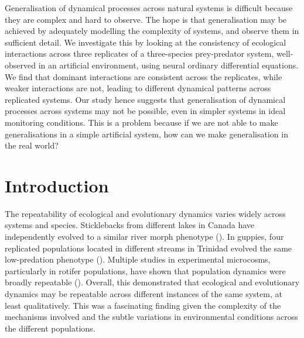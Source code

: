 \documentclass[11pt, oneside]{article}
\begin{document}
Generalisation of dynamical processes across natural systems is difficult because they are complex and hard to observe.
The hope is that generalisation may be achieved by adequately modelling the complexity of systems, and observe them in sufficient detail.
We investigate this by looking at the consistency of ecological interactions across three replicates of a three-species prey-predator system, well-observed in an artificial environment, using neural ordinary differential equations.
We find that dominant interactions are consistent across the replicates, while weaker interactions are not, leading to different dynamical patterns across replicated systems.
Our study hence suggests that generalisation of dynamical processes across systems may not be possible, even in simpler systems in ideal monitoring conditions.
This is a problem because if we are not able to make generalisations in a simple artificial system, how can we make generalisation in the real world?

\newpage
{}
\setcounter{page}{1}
\linenumbers

\section{Introduction}

The repeatability of ecological and evolutionary dynamics varies widely across systems and species.
Sticklebacks from different lakes in Canada have independently evolved to a similar river morph phenotype (\cite{Thompson1997}).
In guppies, four replicated populations located in different streams in Trinidad evolved the same low-predation phenotype (\cite{Reznick1990a}). 
Multiple studies in experimental microcosms, particularly in rotifer populations, have shown that population dynamics were broadly repeatable (\cite{Yoshida2003, Yoshida2007, Becks2010, Becks2012, Hiltunen2013}).
Overall, this demonstrated that ecological and evolutionary dynamics may be repeatable across different instances of the same system, at least qualitatively.
This was a fascinating finding given the complexity of the mechanisms involved and the subtle variations in environmental conditions across the different populations.
\end{document}
